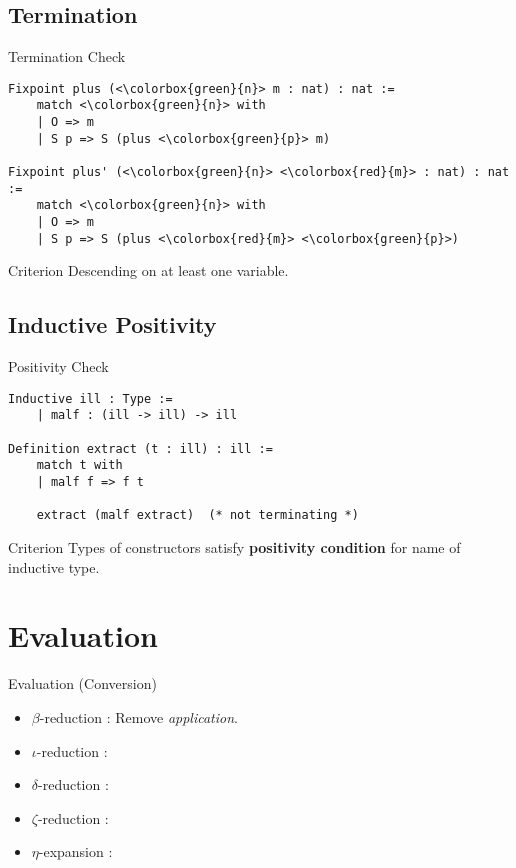 \documentclass[UTF-8]{beamer}
\begin{document}
\subsection{Termination}
\begin{frame}[fragile]{Termination Check}
\begin{verbatim}
Fixpoint plus (<\colorbox{green}{n}> m : nat) : nat :=
    match <\colorbox{green}{n}> with
    | O => m
    | S p => S (plus <\colorbox{green}{p}> m)

Fixpoint plus' (<\colorbox{green}{n}> <\colorbox{red}{m}> : nat) : nat :=
    match <\colorbox{green}{n}> with
    | O => m
    | S p => S (plus <\colorbox{red}{m}> <\colorbox{green}{p}>)
\end{verbatim}
\begin{alertblock}{Criterion}
    Descending on at least one variable.
\end{alertblock}
\end{frame}

\subsection{Inductive Positivity}
\begin{frame}[fragile]{Positivity Check}
\begin{verbatim}
Inductive ill : Type :=
    | malf : (ill -> ill) -> ill 

Definition extract (t : ill) : ill :=
    match t with
    | malf f => f t

    extract (malf extract)  (* not terminating *)
\end{verbatim}
\begin{alertblock}{Criterion}
    Types of constructors satisfy \textbf{positivity condition} for name of inductive type.
\end{alertblock}
\end{frame}

\section{Evaluation}
\begin{frame}{Evaluation (Conversion)}
\begin{itemize}
    \item $\beta$-reduction : Remove \textit{application}.
    \item $\iota$-reduction : 
    \item $\delta$-reduction : 
    \item $\zeta$-reduction :
    \item $\eta$-expansion :
\end{itemize}
\end{frame}
\end{document}
